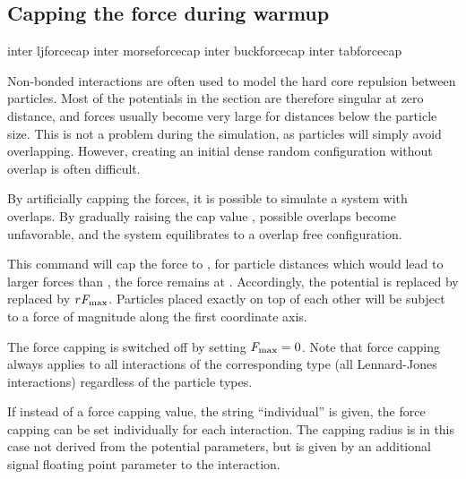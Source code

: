 \subsection{Capping the force during warmup}
\label{sec:forcecap}

\begin{essyntax}
   inter ljforcecap 
   inter morseforcecap 
   inter buckforcecap 
   inter tabforcecap 
  \begin{features}
  \end{features}  
\end{essyntax}

Non-bonded interactions are often used to model the hard core
repulsion between particles. Most of the potentials in the section are
therefore singular at zero distance, and forces usually become very
large for distances below the particle size. This is not a problem
during the simulation, as particles will simply avoid overlapping.
However, creating an initial dense random configuration without
overlap is often difficult.

By artificially capping the forces, it is possible to simulate a
system with overlaps. By gradually raising the cap value
, possible overlaps become unfavorable, and the
system equilibrates to a overlap free configuration.

This command will cap the force to , \ie for
particle distances which would lead to larger forces than
, the force remains at .
Accordingly, the potential is replaced by replaced by $r
\mathrm{\mathit{F_\mathrm{max}}}$. Particles placed exactly on top of each other
will be subject to a force of magnitude  along
the first coordinate axis.

The force capping is switched off by setting $\mathrm{\mathit{F_\mathrm{max}}}=0$.
Note that force capping always applies to all interactions of the
corresponding type (\eg all Lennard-Jones interactions) regardless of
the particle types.

If instead of a force capping value, the string ``individual'' is
given, the force capping can be set individually for each
interaction. The capping radius is in this case not derived from the
potential parameters, but is given by an additional signal floating
point parameter to the interaction.

